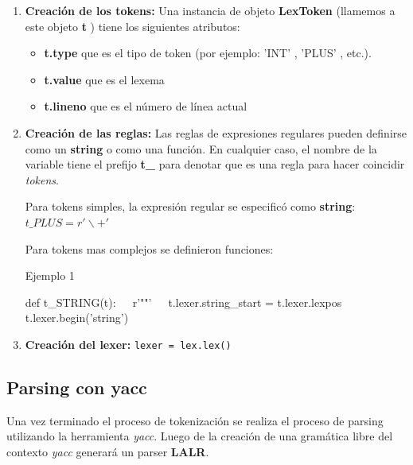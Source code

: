 \documentclass[a4paper,10pt,twocolumn]{article}
\begin{document}
\begin{enumerate}
	\item \textbf{Creación de los tokens:} 
	Una instancia de objeto \textbf{LexToken} (llamemos a este objeto \textbf{t} ) tiene los siguientes atributos:
	\begin{itemize}
		\item \textbf{t.type} que es el tipo de token (por ejemplo: 'INT' , 'PLUS' , etc.).
		\item \textbf{t.value} que es el lexema
		\item \textbf{t.lineno} que es el número de línea actual
	\end{itemize} 

	\item \textbf{Creación de las reglas: }
	Las reglas de expresiones regulares pueden definirse como un \textbf{string} o como una función. En cualquier caso, el nombre de la variable tiene el prefijo \textbf{t\_} para denotar que es una regla para hacer coincidir \textit{tokens}.
	
	Para tokens simples, la expresión regular se especificó como \textbf{string}: $t\_PLUS = r'\backslash+'$
	
	Para tokens mas complejos se definieron funciones:
	
	\begin{algorithm}
		\caption{Ejemplo 1}
		\begin{algorithmic}
			\STATE def t\_STRING(t):
			\STATE $\;\;\; $ r'""'
			\STATE $\;\;\; $ t.lexer.string\_start = t.lexer.lexpos
			\STATE $\;\;\; $ t.lexer.begin('string')
		\end{algorithmic}
	\end{algorithm}
	\item \textbf{Creación del lexer:} \lstinline|lexer = lex.lex()|
\end{enumerate}

\subsection{Parsing con yacc}

Una vez terminado el proceso de tokenización se realiza el proceso de parsing utilizando la herramienta \textit{yacc}. Luego de la creación de una gramática libre del contexto \textit{yacc} generará un parser \textbf{LALR}.
\end{document}

